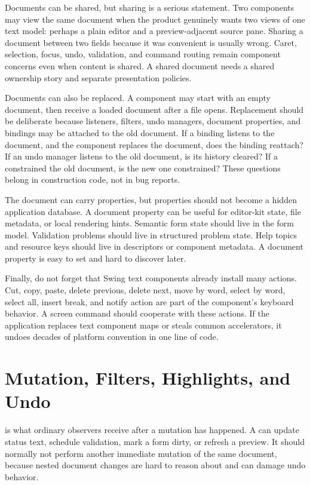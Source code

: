 Documents can be shared, but sharing is a serious statement. Two components may
view the same document when the product genuinely wants two views of one text
model: perhaps a plain editor and a preview-adjacent source pane. Sharing a
document between two fields because it was convenient is usually wrong. Caret,
selection, focus, undo, validation, and command routing remain component
concerns even when content is shared. A shared document needs a shared
ownership story and separate presentation policies.

Documents can also be replaced. A component may start with an empty document,
then receive a loaded document after a file opens. Replacement should be
deliberate because listeners, filters, undo managers, document properties, and
bindings may be attached to the old document. If a binding listens to the
document, and the component replaces the document, does the binding reattach?
If an undo manager listens to the old document, is its history cleared? If a
 constrained the old document, is the new one constrained?
These questions belong in construction code, not in bug reports.

The document can carry properties, but properties should not become a hidden
application database. A document property can be useful for editor-kit state,
file metadata, or local rendering hints. Semantic form state should live in the
form model. Validation problems should live in structured problem state. Help
topics and resource keys should live in descriptors or component metadata. A
document property is easy to set and hard to discover later.

Finally, do not forget that Swing text components already install many actions.
Cut, copy, paste, delete previous, delete next, move by word, select by word,
select all, insert break, and notify action are part of the component's
keyboard behavior. A screen command should cooperate with these actions. If the
application replaces text component maps or steals common accelerators, it
undoes decades of platform convention in one line of code.

\section{Mutation, Filters, Highlights, and Undo}

 is what ordinary observers receive after a mutation has happened. A  can update status text, schedule validation, mark a form dirty, or refresh a preview. It should normally not perform another immediate mutation of the same document, because nested document changes are hard to reason about and can damage undo behavior.

